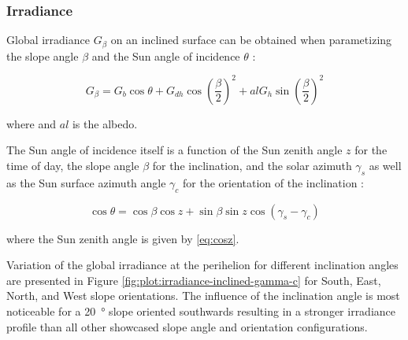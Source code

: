 \subsubsection{Irradiance}
\label{sec:MartianEnvironment:SolarRadiation:InclinedSurface:Irradiance}

Global irradiance $G_{\beta}$ on an inclined surface can be obtained when parametizing the slope angle $\beta$ and the Sun angle of incidence $\theta$ :

\begin{equation}
  \label{eq:G_beta}
  G_{\beta} = G_{b}\cos{\theta} + G_{dh}\cos{(\frac{\beta}{2})}^2 + al G_{h} \sin{(\frac{\beta}{2})}^2
\end{equation}

where and $al$ is the albedo.

The Sun angle of incidence itself is a function of the Sun zenith angle $z$ for the time of day, the slope angle $\beta$ for the inclination, and the solar azimuth $\gamma_{s}$ as well as the Sun surface azimuth angle $\gamma_{c}$ for the orientation of the inclination :

\begin{equation}
  \label{eq:costheta}
  \cos{\theta} = \cos{\beta}\cos{z} +  \sin{\beta}\sin{z}\cos{(\gamma_{s} - \gamma_{c})}
\end{equation}

where the Sun zenith angle is given by \ref{eq:cosz}.

Variation of the global irradiance at the perihelion for different inclination angles are presented in Figure \ref{fig:plot:irradiance-inclined-gamma-c} for South, East, North, and West slope orientations. The influence of the inclination angle is most noticeable for a \SI{20}{\degree} slope oriented southwards resulting in a stronger irradiance profile than all other showcased slope angle and orientation configurations.

